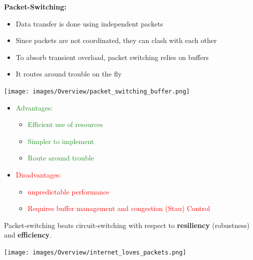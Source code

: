 \documentclass[a4paper, fontsize=8pt, landscape, DIV=1]{scrartcl}
\begin{document}
\begin{multicols*}{4}
		\textbf{Packet-Switching:}
		\vspace{-0.2cm}
		\begin{itemize}[noitemsep]
			\item Data transfer is done using independent packets 
			\item Since packets are not coordinated, they can clash with each other \
			\item To absorb transient overload, packet switching relies on buffers 
			\item It routes around trouble on the fly
		\end{itemize}
		
		\texttt{[image: images/Overview/packet\_switching\_buffer.png]}
		\begin{itemize}[noitemsep]
			\item \textcolor{ForestGreen}{Advantages:}
			\begin{itemize}
				\item \textcolor{ForestGreen}{Efficient use of resources} 
				\item \textcolor{ForestGreen}{Simpler to implement}
				\item \textcolor{ForestGreen}{Route around trouble}
			\end{itemize}
			\item \textcolor{red}{Disadvantages:}
			\begin{itemize}
				\item \textcolor{red}{unpredictable performance}
				\item \textcolor{red}{Requires buffer management and congestion (Stau)
					Control}
			\end{itemize} 
		\end{itemize}
		Packet-switching beats circuit-switching with respect to \textbf{resiliency}
		(robustness) and \textbf{efficiency}. 
		
		\texttt{[image: images/Overview/internet\_loves\_packets.png]}
		\newpage
		

\end{multicols*}
\end{document}
